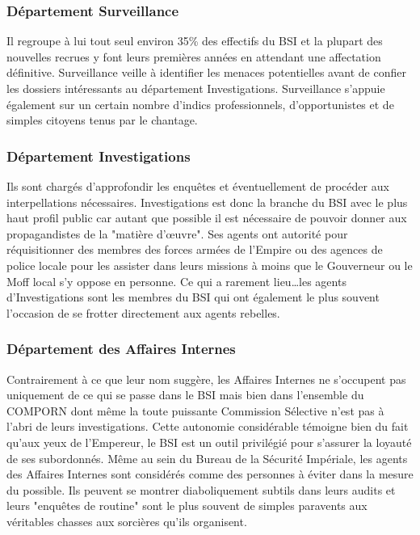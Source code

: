 \documentclass[twoside]{article}
\begin{document}
\subsubsection{Département Surveillance}
Il regroupe à lui tout seul environ 35\% des effectifs du BSI et la plupart des nouvelles recrues y font leurs premières années en attendant une affectation définitive. Surveillance veille à identifier les menaces potentielles avant de confier les dossiers intéressants au département Investigations. Surveillance s'appuie également sur un certain nombre d'indics professionnels, d'opportunistes et de simples citoyens tenus par le chantage.

\subsubsection{Département Investigations}
Ils sont chargés d'approfondir les enquêtes et éventuellement de procéder aux interpellations nécessaires. Investigations est donc la branche du BSI avec le plus haut profil public car autant que possible il est nécessaire de pouvoir donner aux propagandistes de la "matière d'\oe uvre". Ses agents ont autorité pour réquisitionner des membres des forces armées de l'Empire ou des agences de police locale pour les assister dans leurs missions à moins que le Gouverneur ou le Moff local s'y oppose en personne. Ce qui a rarement lieu\ldots les agents d'Investigations sont les membres du BSI qui ont également le plus souvent l'occasion de se frotter directement aux agents rebelles.

\subsubsection{Département des Affaires Internes}
Contrairement à ce que leur nom suggère, les Affaires Internes ne s'occupent pas uniquement de ce qui se passe dans le BSI mais bien dans l'ensemble du COMPORN dont même la toute puissante Commission Sélective n'est pas à l'abri de leurs investigations. Cette autonomie considérable témoigne bien du fait qu'aux yeux de l'Empereur, le BSI est un outil privilégié pour s'assurer la loyauté de ses subordonnés. Même au sein du Bureau de la Sécurité Impériale, les agents des Affaires Internes sont considérés comme des personnes à éviter dans la mesure du possible. Ils peuvent se montrer diaboliquement subtils dans leurs audits et leurs "enquêtes de routine" sont le plus souvent de simples paravents aux véritables chasses aux sorcières qu'ils organisent.
\end{document}
